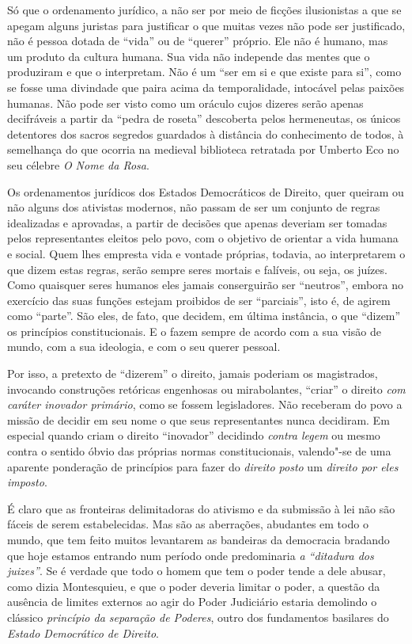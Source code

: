 Só que o ordenamento jurídico, a não ser por meio de ficções
ilusionistas a que se apegam alguns juristas para justificar o que
muitas vezes não pode ser justificado, não é pessoa dotada de
``vida'' ou de ``querer'' próprio. Ele não é humano, mas
um produto da cultura humana. Sua vida não independe das mentes que o
produziram e que o interpretam. Não é um ``ser em si e que existe
para si'', como se fosse uma divindade que paira acima da
temporalidade, intocável pelas paixões humanas. Não pode ser visto como
um oráculo cujos dizeres serão apenas decifráveis a partir da
``pedra de roseta'' descoberta pelos hermeneutas, os únicos
detentores dos sacros segredos guardados à distância do conhecimento de
todos, à semelhança do que ocorria na medieval biblioteca retratada por
Umberto Eco no seu célebre \emph{O Nome da Rosa}.

Os ordenamentos jurídicos dos Estados Democráticos de Direito, quer
queiram ou não alguns dos ativistas modernos, não passam de ser um
conjunto de regras idealizadas e aprovadas, a partir de decisões que
apenas deveriam ser tomadas pelos representantes eleitos pelo povo, com
o objetivo de orientar a vida humana e social. Quem lhes empresta vida e
vontade próprias, todavia, ao interpretarem o que dizem estas regras,
serão sempre seres mortais e falíveis, ou seja, os juízes. Como
quaisquer seres humanos eles jamais conserguirão ser ``neutros'',
embora no exercício das suas funções estejam proibidos de ser
``parciais'', isto é, de agirem como ``parte''. São eles,
de fato, que decidem, em última instância, o que ``dizem'' os princípios
constitucionais. E o fazem sempre de acordo com a sua visão de mundo,
com a sua ideologia, e com o seu querer pessoal.

Por isso, a pretexto de ``dizerem'' o direito, jamais poderiam os
magistrados, invocando construções retóricas engenhosas ou mirabolantes,
``criar'' o direito \emph{com caráter inovador primário}, como se
fossem legisladores. Não receberam do povo a missão de decidir em seu
nome o que seus representantes nunca decidiram. Em especial quando criam
o direito ``inovador'' decidindo \emph{contra legem} ou mesmo contra o
sentido óbvio das próprias normas constitucionais, valendo"-se de uma
aparente ponderação de princípios para fazer do \emph{direito posto} um
\emph{direito por eles imposto}.

É claro que as fronteiras delimitadoras do ativismo e da submissão à lei
não são fáceis de serem estabelecidas. Mas são as aberrações, abudantes
em todo o mundo, que tem feito muitos levantarem as bandeiras da
democracia bradando que hoje estamos entrando num período onde
predominaria \emph{a ``ditadura dos juizes''}. Se é verdade que todo o
homem que tem o poder tende a dele abusar, como dizia Montesquieu, e que
o poder deveria limitar o poder, a questão da ausência de limites
externos ao agir do Poder Judiciário estaria demolindo o clássico
\emph{princípio da separação de Poderes}, outro dos fundamentos
basilares do \emph{Estado Democrático de Direito}.

